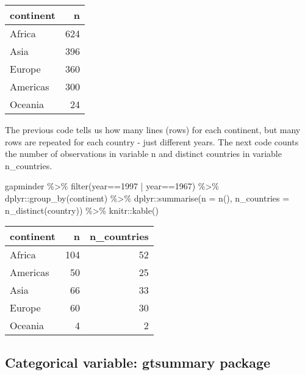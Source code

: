 \documentclass[
]{book}
\newenvironment{Shaded}{\begin{snugshade}}{\end{snugshade}}
\newcommand{\AttributeTok}[1]{\textcolor[rgb]{0.77,0.63,0.00}{#1}}
\newcommand{\DecValTok}[1]{\textcolor[rgb]{0.00,0.00,0.81}{#1}}
\newcommand{\FunctionTok}[1]{\textcolor[rgb]{0.00,0.00,0.00}{#1}}
\newcommand{\NormalTok}[1]{#1}
\newcommand{\SpecialCharTok}[1]{\textcolor[rgb]{0.00,0.00,0.00}{#1}}
\begin{document}
\begin{tabular}{l|r}
\hline
continent & n\\
\hline
Africa & 624\\
\hline
Asia & 396\\
\hline
Europe & 360\\
\hline
Americas & 300\\
\hline
Oceania & 24\\
\hline
\end{tabular}

The previous code tells us how many lines (rows) for each continent, but many rows are repeated for each country - just different years. The next code counts the number of observations in variable n and distinct countries in variable n\_countries.

\begin{Shaded}
\begin{Highlighting}[]
\NormalTok{gapminder }\SpecialCharTok{\%\textgreater{}\%} \FunctionTok{filter}\NormalTok{(year}\SpecialCharTok{==}\DecValTok{1997} \SpecialCharTok{|}\NormalTok{ year}\SpecialCharTok{==}\DecValTok{1967}\NormalTok{) }\SpecialCharTok{\%\textgreater{}\%}
\NormalTok{  dplyr}\SpecialCharTok{::}\FunctionTok{group\_by}\NormalTok{(continent) }\SpecialCharTok{\%\textgreater{}\%}
\NormalTok{  dplyr}\SpecialCharTok{::}\FunctionTok{summarise}\NormalTok{(}\AttributeTok{n =} \FunctionTok{n}\NormalTok{(), }\AttributeTok{n\_countries =} \FunctionTok{n\_distinct}\NormalTok{(country)) }\SpecialCharTok{\%\textgreater{}\%}\NormalTok{ knitr}\SpecialCharTok{::}\FunctionTok{kable}\NormalTok{()}
\end{Highlighting}
\end{Shaded}

\begin{tabular}{l|r|r}
\hline
continent & n & n\_countries\\
\hline
Africa & 104 & 52\\
\hline
Americas & 50 & 25\\
\hline
Asia & 66 & 33\\
\hline
Europe & 60 & 30\\
\hline
Oceania & 4 & 2\\
\hline
\end{tabular}

\hypertarget{categorical-variable-gtsummary-package}{%
\subsection{Categorical variable: gtsummary package}\label{categorical-variable-gtsummary-package}}
\end{document}
